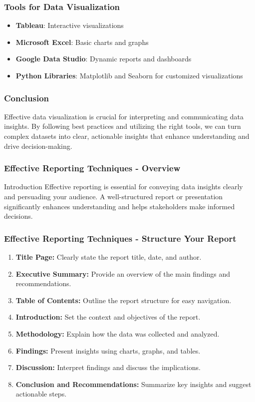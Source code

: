 \documentclass[aspectratio=169]{beamer}
\begin{document}
\begin{frame}[fragile]
    \frametitle{Tools for Data Visualization}
    \begin{itemize}
        \item \textbf{Tableau}: Interactive visualizations
        \item \textbf{Microsoft Excel}: Basic charts and graphs
        \item \textbf{Google Data Studio}: Dynamic reports and dashboards
        \item \textbf{Python Libraries}: Matplotlib and Seaborn for customized visualizations
    \end{itemize}
\end{frame}

\begin{frame}[fragile]
    \frametitle{Conclusion}
    Effective data visualization is crucial for interpreting and communicating data insights. By following best practices and utilizing the right tools, we can turn complex datasets into clear, actionable insights that enhance understanding and drive decision-making.
\end{frame}

\begin{frame}[fragile]
    \frametitle{Effective Reporting Techniques - Overview}
    \begin{block}{Introduction}
        Effective reporting is essential for conveying data insights clearly and persuading your audience.
        A well-structured report or presentation significantly enhances understanding and helps stakeholders make informed decisions.
    \end{block}
\end{frame}

\begin{frame}[fragile]
    \frametitle{Effective Reporting Techniques - Structure Your Report}
    \begin{enumerate}
        \item \textbf{Title Page:} Clearly state the report title, date, and author.
        \item \textbf{Executive Summary:} Provide an overview of the main findings and recommendations.
        \item \textbf{Table of Contents:} Outline the report structure for easy navigation.
        \item \textbf{Introduction:} Set the context and objectives of the report.
        \item \textbf{Methodology:} Explain how the data was collected and analyzed.
        \item \textbf{Findings:} Present insights using charts, graphs, and tables.
        \item \textbf{Discussion:} Interpret findings and discuss the implications.
        \item \textbf{Conclusion and Recommendations:} Summarize key insights and suggest actionable steps.
    \end{enumerate}
\end{frame}
\end{document}
